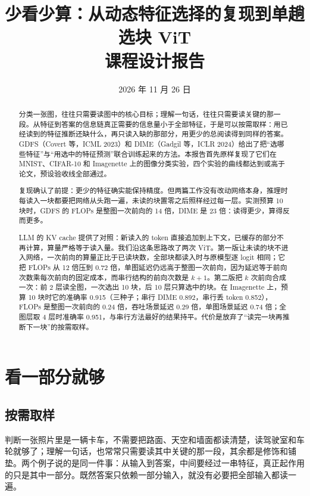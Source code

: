 \documentclass[11pt,a4paper,UTF8,fontset=none]{ctexart}
\title{少看少算：从动态特征选择的复现到单趟选块 ViT\\[0.4em]\large 课程设计报告}
\author{}
\date{2026 年 11 月 26 日}
\newcommand{\dense}{整图一次前向}
\newcommand{\tokdrop}{丢 token}
\begin{document}
\maketitle
\thispagestyle{empty}

\begin{abstract}
分类一张图，往往只需要读图中的核心目标；理解一句话，往往只需要读关键的那一段。从特征到答案的信息链真正需要的信息量小于全部特征，于是可以按需取样：用已经读到的特征推断还缺什么，再只读入缺的那部分，用更少的总阅读得到同样的答案。GDFS（Covert 等，ICML 2023）和 DIME（Gadgil 等，ICLR 2024）给出了把“选哪些特征”与“用选中的特征预测”联合训练起来的方法。本报告首先原样复现了它们在 MNIST、CIFAR-10 和 Imagenette 上的图像分类实验，四个实验的曲线都达到或高于论文，预设验收线全部通过。

复现确认了前提：更少的特征确实能保持精度。但两篇工作没有改动网络本身，推理时每读入一块都要把网络从头跑一遍，未读的块置零之后照样经过每一层。实测预算 10 块时，GDFS 的 FLOPs 是\dense 的 14 倍，DIME 是 23 倍：读得更少，算得反而更多。

LLM 的 KV cache 提供了对照：新读入的 token 直接追加到上下文，已缓存的部分不再计算，算量严格等于读入量。我们沿这条思路改了两次 ViT。第一版让未读的块不进入网络，一次前向的算量正比于已读块数，全部块都读入时与原模型逐 logit 相同；它把 FLOPs 从 12 倍压到 0.72 倍，单图延迟仍远高于整图一次前向，因为延迟等于前向次数乘每次前向的固定成本，而串行结构的前向次数是 $k+1$。第二版把 $k$ 次前向合成一次：前 2 层读全图，一次选出 10 块，后 10 层只算选中的块。在 Imagenette 上，预算 10 块时它的准确率 0.915（三种子；串行 DIME 0.892，串行\tokdrop{} 0.852），FLOPs 是\dense 的 0.24 倍，吞吐场景延迟 0.29 倍，单图场景延迟 0.74 倍；全图层取 4 层时准确率 0.951，与串行方法最好的结果持平。代价是放弃了“读完一块再推断下一块”的按需取样。
\end{abstract}

\tableofcontents
\bigskip

\section{看一部分就够}

\subsection{按需取样}

判断一张照片里是一辆卡车，不需要把路面、天空和墙面都读清楚，读驾驶室和车轮就够了；理解一句话，也常常只需要读其中关键的那一段，其余都是修饰和铺垫。两个例子说的是同一件事：从输入到答案，中间要经过一串特征，真正起作用的只是其中一部分。既然答案只依赖一部分输入，就没有必要把全部输入都读一遍。
\end{document}
